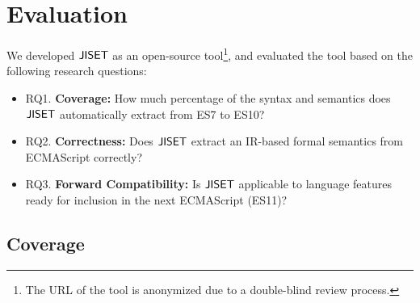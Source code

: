 \section{Evaluation}\label{sec:eval}

We developed \( \text{\sf JISET} \) as an open-source tool\footnote{The URL of the tool is
anonymized due to a double-blind review process.}, and evaluated the tool
based on the following research questions:
\begin{itemize}[leftmargin=0.5cm]
\item RQ1. \textbf{Coverage:} How much percentage of 
the syntax and semantics does \( \text{\sf JISET} \) automatically extract from ES7 to ES10?
\item RQ2. \textbf{Correctness:} Does \( \text{\sf JISET} \) extract an IR-based formal
semantics from ECMAScript correctly?
\item RQ3. \textbf{Forward Compatibility:} Is \( \text{\sf JISET} \) applicable to language
features ready for inclusion in the next ECMAScript (ES11)?
\end{itemize}


\subsection{Coverage}

